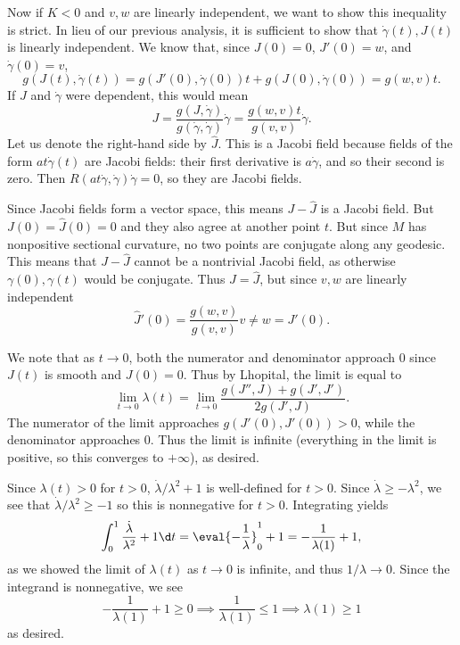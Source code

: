     Now if $K<0$ and $v,w$ are linearly independent, we want to show this inequality is strict.
    In lieu of our previous analysis, it is sufficient to show that $\dot\gamma(t),J(t)$ is linearly independent.
    We know that, since $J(0)=0$, $J'(0)=w$, and $\dot\gamma(0)=v$,
    $$ g(J(t),\dot\gamma(t)) = g(J'(0),\dot\gamma(0))t + g(J(0),\dot\gamma(0)) = g(w,v)t . $$
    If $J$ and $\dot\gamma$ were dependent, this would mean
    $$ J = \frac{g(J,\dot\gamma)}{g(\dot\gamma,\dot\gamma)}\dot\gamma = \frac{g(w,v)t}{g(v,v)}\dot\gamma . $$
    Let us denote the right-hand side by $\hat J$.
    This is a Jacobi field because fields of the form $at\dot\gamma(t)$ are Jacobi fields: their first derivative
    is $a\dot\gamma$, and so their second is zero.
    Then $R(at\dot\gamma,\dot\gamma)\dot\gamma=0$, so they are Jacobi fields.

    Since Jacobi fields form a vector space, this means $J-\hat J$ is a Jacobi field.
    But $J(0)=\hat J(0)=0$ and they also agree at another point $t$.
    But since $M$ has nonpositive sectional curvature, no two points are conjugate along any geodesic.
    This means that $J-\hat J$ cannot be a nontrivial Jacobi field, as otherwise $\gamma(0),\gamma(t)$ would be
    conjugate.
    Thus $J=\hat J$, but since $v,w$ are linearly independent
    $$ \hat J'(0) = \frac{g(w,v)}{g(v,v)}v \neq w = J'(0) . $$
 
    \item We note that as $t\to0$, both the numerator and denominator approach $0$ since $J(t)$ is smooth and $J(0)=0$.
    Thus by Lhopital, the limit is equal to
    $$ \lim_{t\to0}\lambda(t) = \lim_{t\to0}\frac{g(J'',J) + g(J',J')}{2g(J',J)} . $$
    The numerator of the limit approaches $g(J'(0),J'(0))>0$, while the denominator approaches $0$.
    Thus the limit is infinite (everything in the limit is positive, so this converges to $+\infty$), as desired.

    Since $\lambda(t)>0$ for $t>0$, $\dot\lambda/\lambda^2+1$ is well-defined for $t>0$.
    Since $\dot\lambda\geq-\lambda^2$, we see that $\dot\lambda/\lambda^2\geq-1$ so this is nonnegative for $t>0$.
    Integrating yields
    $$ \int_0^1\frac{\dot\lambda}{\lambda^2} + 1\d t = \eval{-\frac1{\lambda}}^1_0 + 1 = -\frac1{\lambda(1)} + 1 , $$
    as we showed the limit of $\lambda(t)$ as $t\to0$ is infinite, and thus $1/\lambda\to0$.
    Since the integrand is nonnegative, we see
    $$ -\frac1{\lambda(1)} + 1 \geq 0 \implies \frac1{\lambda(1)} \leq 1 \implies \lambda(1) \geq 1 $$
    as desired.

